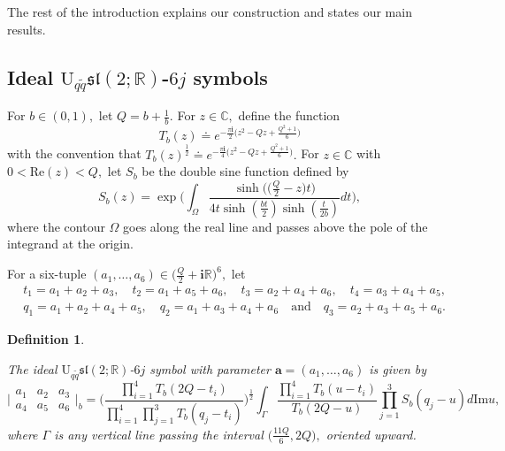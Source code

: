 \documentclass[11pt]{article}
\newtheorem{definition}[theorem]{Definition}
\theoremstyle{remark}
\theoremstyle{remark}
\numberwithin{equation}{section}
\begin{document}
The rest of the introduction explains our construction and states our main results.


    
\subsection{Ideal $\mathrm {U}_{q\tilde q}\mathfrak{sl}(2;\mathbb R)$-$6j$ symbols}

For $b\in (0,1),$ let $Q=b+\frac{1}{b}.$ For $z\in \mathbb C,$ define the function 
$$T_b(z)\doteq e^{-\frac{\pi\mathbf i}{2}\big(z^2-Qz+\frac{Q^2+1}{6}\big)}$$
with the convention that $T_b(z)^{\frac{1}{2}}\doteq e^{-\frac{\pi\mathbf i}{4}\big(z^2-Qz+\frac{Q^2+1}{6}\big)}.$  For $z\in \mathbb C$ with $0<\mathrm{Re}(z)<Q,$ let $S_b$ be the double sine function defined by
\begin{equation*}
S_b(z)=\exp\Bigg(\int_\Omega\frac{\sinh\Big(\big(\frac{Q}{2}-z\big)t\Big)}{4t\sinh(\frac{bt}{2})\sinh(\frac{t}{2b})}dt\Bigg),
\end{equation*}
where the contour $\Omega$ goes along the real line and passes above the pole of the integrand at the origin.

For a six-tuple $(a_1,\dots,a_6)\in \big( \frac{Q}{2}+ \mathbf i \mathbb R\big)^6,$ let  
\begin{equation*}
\begin{split}
   & t_1=a_1+a_2+a_3,\quad  t_2=a_1+a_5+a_6,\quad t_3=a_2+a_4+a_6,\quad  t_4=a_3+a_4+a_5,\\
   & q_1=a_1+a_2+a_4+a_5,\quad q_2=a_1+a_3+a_4+a_6 \quad\text{and}\quad   
q_3=a_2+a_3+a_5+a_6.
\end{split}
\end{equation*}

\begin{definition}\label{def:ideal 6j}


The \emph{ideal $\mathrm {U}_{q\tilde q}\mathfrak{sl}(2;\mathbb R)$-$6j$ symbol} with parameter $\boldsymbol a=(a_1,\dots,a_6)$ is given by
\begin{equation}\label{b-6j}
\bigg|\begin{matrix} a_1 & a_2 & a_3 \\ a_4 & a_5 & a_6 \end{matrix} \bigg|_b=\Bigg(\frac{\prod_{i=1}^4 T_b(2Q-t_i)}{\prod_{i=1}^4\prod _{j=1}^3 T_b(q_j-t_i)}\Bigg)^{\frac{1}{2}}\int_\Gamma \frac{\prod_{i=1}^4 T_b(u-t_i)}{T_b(2Q-u)}\prod_{j=1}^3S_b(q_j-u)d\mathrm{Im}u,
\end{equation}
where $\Gamma$ is any vertical line passing the interval $\big(\frac{11Q}{6},2Q\big),$
oriented upward.
\end{definition}
\end{document}
